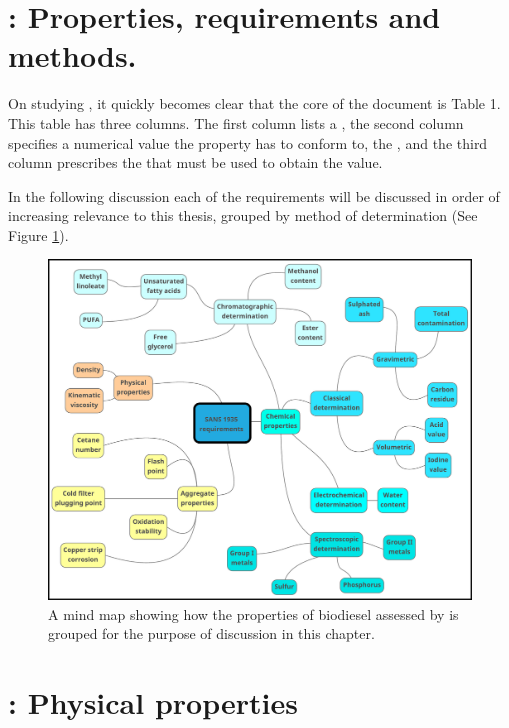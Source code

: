 \section{: Properties, requirements and methods.}

On studying , it quickly becomes clear that the core of the
document is Table 1. This table has three columns. The first column lists a
, the second column specifies a numerical value the property
has to conform to, the , and the third column prescribes
the  that must be used to obtain the value.

In the following discussion each of the requirements will be discussed in order
of increasing relevance to this thesis, grouped by method of determination (See
Figure \ref{fig:MindMap}).


\begin{figure}
\centering
\includegraphics[width=\textwidth]{Figures/SANS1935MindMap.pdf}
\decoRule

\caption[Discussion of ]{A mind map showing how the properties of
biodiesel assessed by  is grouped for the purpose of discussion
in this chapter.}

\label{fig:MindMap}
\end{figure}

\section{: Physical properties}

